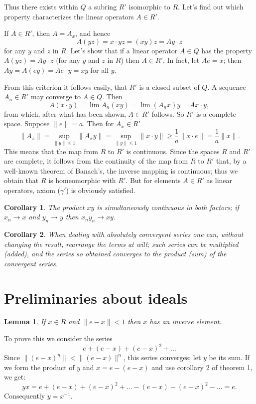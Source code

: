 \documentclass{article}
\newtheorem{corollary}{Corollary}
\newtheorem{lemma}{Lemma}
\theoremstyle{definition}
\begin{document}
Thus there exists within $Q$ a subring $R'$ isomorphic to $R$. Let's find out which property characterizes the linear operators $A\in R'$.

If $A\in R'$, then $A=A_x$, and hence
$$ A(yz) = x\cdot yz = (xy)z = Ay\cdot z $$
for any $y$ and $z$ in $R$. Let's show that if a linear operator $A\in Q$ has the property $A(yz)=Ay\cdot z$ (for any $y$ and $z$ in $R$) then $A\in R'$. In fact, let $Ae=x$; then $Ay=A(ey)=Ae\cdot y=xy$ for all $y$.

From this criterion it follows easily, that $R'$ is a closed subset of $Q$. A sequence $A_n\in R'$ may converge to $A\in Q$. Then $$A(x\cdot y)=\lim A_n(xy)=\lim (A_nx)y=Ax\cdot y,$$ from which, after what has been shown, $A\in R'$ follows. So $R'$ is a complete space. Suppose $\|e\|=a$. Then for $A_x\in R'$
$$ \|A_x\| = \sup_{\|y\|\leq1}\|A_xy\| = \sup_{\|y\|\leq1}\|x\cdot y\| \geq \frac1a \|x\cdot e\| = \frac1a\|x\|. $$
This means that the map from $R$ to $R'$ is continuous. Since the spaces $R$ and $R'$ are complete, it follows from the continuity of the map from $R$ to $R'$ that, by a well-known theorem of Banach's, the inverse mapping is continuous; thus we obtain that $R$ is homeomorphic with $R'$. But for elements $A\in R'$ as linear operators, axiom ($\gamma'$) is obviously satisfied.
\begin{corollary}
  The product $xy$ is simultaneously continuous in both factors; if $x_n \to x$ and $y_n \to y$ then $x_ny_n \to xy$.
\end{corollary}
\begin{corollary}
  When dealing with absolutely convergent series one can, without changing the result, rearrange the terms at will; such series can be multiplied (added), and the series so obtained converges to the product (sum) of the convergent series.
\end{corollary}

\section{Preliminaries about ideals}
\begin{lemma}
  If $x\in R$ and $\|e - x\| < 1$ then $x$ has an inverse element.
\end{lemma}
To prove this we consider the series
$$ e + (e-x) + (e-x)^2 + \dots $$
Since $\|(e - x)^n\| < \|(e - x)\|^n$, this series converges; let $y$ be its sum. If we form the product of $y$ and $x=e-(e-x)$ and use corollary 2 of theorem 1, we get:
$$ yx = e + (e-x) + (e-x)^2 + \dots - (e-x) - (e-x)^2 - \dots = e. $$
Consequently $y = x^{-1}$.
\end{document}
